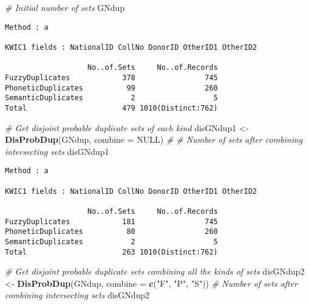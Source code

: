 \documentclass[
]{article}
\newenvironment{Shaded}{\begin{snugshade}}{\end{snugshade}}
\newcommand{\CommentTok}[1]{\textcolor[rgb]{0.56,0.35,0.01}{\textit{#1}}}
\newcommand{\DataTypeTok}[1]{\textcolor[rgb]{0.13,0.29,0.53}{#1}}
\newcommand{\KeywordTok}[1]{\textcolor[rgb]{0.13,0.29,0.53}{\textbf{#1}}}
\newcommand{\NormalTok}[1]{#1}
\newcommand{\OtherTok}[1]{\textcolor[rgb]{0.56,0.35,0.01}{#1}}
\newcommand{\StringTok}[1]{\textcolor[rgb]{0.31,0.60,0.02}{#1}}
\begin{document}
\begin{Shaded}
\begin{Highlighting}[]
\CommentTok{# Initial number of sets}
\NormalTok{GNdup}
\end{Highlighting}
\end{Shaded}

\begin{verbatim}
Method : a

KWIC1 fields : NationalID CollNo DonorID OtherID1 OtherID2
 
                   No..of.Sets     No..of.Records
FuzzyDuplicates            378                745
PhoneticDuplicates          99                260
SemanticDuplicates           2                  5
Total                      479 1010(Distinct:762)
\end{verbatim}

\begin{Shaded}
\begin{Highlighting}[]
\CommentTok{# Get disjoint probable duplicate sets of each kind}
\NormalTok{disGNdup1 <-}\StringTok{ }\KeywordTok{DisProbDup}\NormalTok{(GNdup, }\DataTypeTok{combine =} \OtherTok{NULL}\NormalTok{)}
\CommentTok{# # Number of sets after combining intersecting sets}
\NormalTok{disGNdup1}
\end{Highlighting}
\end{Shaded}

\begin{verbatim}
Method : a

KWIC1 fields : NationalID CollNo DonorID OtherID1 OtherID2
 
                   No..of.Sets     No..of.Records
FuzzyDuplicates            181                745
PhoneticDuplicates          80                260
SemanticDuplicates           2                  5
Total                      263 1010(Distinct:762)
\end{verbatim}

\begin{Shaded}
\begin{Highlighting}[]
\CommentTok{# Get disjoint probable duplicate sets combining all the kinds of sets}
\NormalTok{disGNdup2 <-}\StringTok{ }\KeywordTok{DisProbDup}\NormalTok{(GNdup, }\DataTypeTok{combine =} \KeywordTok{c}\NormalTok{(}\StringTok{"F"}\NormalTok{, }\StringTok{"P"}\NormalTok{, }\StringTok{"S"}\NormalTok{))}
\CommentTok{# Number of sets after combining intersecting sets}
\NormalTok{disGNdup2}
\end{Highlighting}
\end{Shaded}
\end{document}
